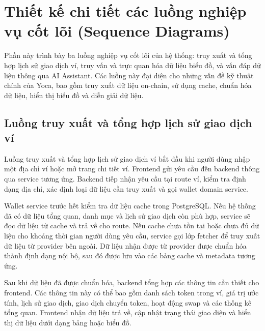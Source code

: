 \section{Thiết kế chi tiết các luồng nghiệp vụ cốt lõi (Sequence Diagrams)}
\label{sec:thiet_ke_luong_nghiep_vu}

Phần này trình bày ba luồng nghiệp vụ cốt lõi của hệ thống: truy xuất và tổng hợp lịch sử giao dịch ví, truy vấn và trực quan hóa dữ liệu biểu đồ, và vấn đáp dữ liệu thông qua AI Assistant. Các luồng này đại diện cho những vấn đề kỹ thuật chính của Yoca, bao gồm truy xuất dữ liệu on-chain, sử dụng cache, chuẩn hóa dữ liệu, hiển thị biểu đồ và diễn giải dữ liệu.

\subsection{Luồng truy xuất và tổng hợp lịch sử giao dịch ví}

Luồng truy xuất và tổng hợp lịch sử giao dịch ví bắt đầu khi người dùng nhập một địa chỉ ví hoặc mở trang chi tiết ví. Frontend gửi yêu cầu đến backend thông qua service tương ứng. Backend tiếp nhận yêu cầu tại route ví, kiểm tra định dạng địa chỉ, xác định loại dữ liệu cần truy xuất và gọi wallet domain service.

Wallet service trước hết kiểm tra dữ liệu cache trong PostgreSQL. Nếu hệ thống đã có dữ liệu tổng quan, danh mục và lịch sử giao dịch còn phù hợp, service sẽ đọc dữ liệu từ cache và trả về cho route. Nếu cache chưa tồn tại hoặc chưa đủ dữ liệu cho khoảng thời gian người dùng yêu cầu, service gọi lớp fetcher để truy xuất dữ liệu từ provider bên ngoài. Dữ liệu nhận được từ provider được chuẩn hóa thành định dạng nội bộ, sau đó được lưu vào các bảng cache và metadata tương ứng.

Sau khi dữ liệu đã được chuẩn hóa, backend tổng hợp các thông tin cần thiết cho frontend. Các thông tin này có thể bao gồm danh sách token trong ví, giá trị ước tính, lịch sử giao dịch, giao dịch chuyển token, hoạt động swap và các thống kê tổng quan. Frontend nhận dữ liệu trả về, cập nhật trạng thái giao diện và hiển thị dữ liệu dưới dạng bảng hoặc biểu đồ.


